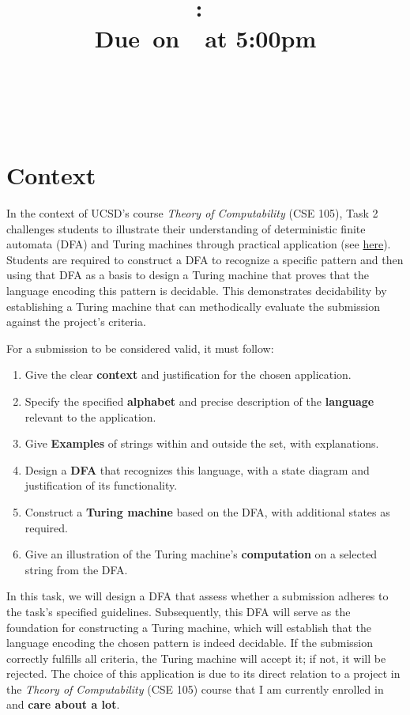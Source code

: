 \documentclass{article}
\title{
    \vspace{2in}
    \textmd{\textbf{\hmwkClass:\ \hmwkTitle}}\\
    \normalsize\vspace{0.1in}\small{Due\ on\ \hmwkDueDate\ at 5:00pm}\\
    \vspace{0.1in}\large{\textit{\hmwkClassInstructor}} \\
    \vspace{3in}
}
\author{
  \hmwkAuthorName \\
  \vspace{0.1in}\small\hmwkPID
}
\date{}
\begin{document}
\maketitle

\pagebreak

\section*{Context}

In the context of UCSD's course \textit{Theory of Computability} (CSE 105), Task 2 challenges
students to illustrate their understanding of deterministic finite automata (DFA) and Turing
machines through practical application (see
\href{https://theory-cs.github.io/output/assignments/projectCSE105W24.html#task-2-illustrating-a-theorem}{here}).
Students are required to construct a DFA to recognize a specific pattern and then using that DFA as
a basis to design a Turing machine that proves that the language encoding this pattern is decidable.
This demonstrates decidability by establishing a Turing machine that can methodically evaluate the
submission against the project's criteria.

For a submission to be considered valid, it must follow:

\begin{enumerate}[Step 1 -]
  \item Give the clear \textbf{context} and justification for the chosen application.
  \item Specify the specified \textbf{alphabet} and precise description of the \textbf{language}
  relevant to the application.
  \item Give \textbf{Examples} of strings within and outside the set, with explanations.
  \item Design a \textbf{DFA} that recognizes this language, with a state diagram and justification
  of its functionality.
  \item Construct a \textbf{Turing machine} based on the DFA, with additional states as required.
  \item Give an illustration of the Turing machine's \textbf{computation} on a selected string from
  the DFA.
\end{enumerate}

In this task, we will design a DFA that assess whether a submission adheres to the task's specified
guidelines. Subsequently, this DFA will serve as the foundation for constructing a Turing machine,
which will establish that the language encoding the chosen pattern is indeed decidable. If the
submission correctly fulfills all criteria, the Turing machine will accept it; if not, it will be
rejected. The choice of this application is due to its direct relation to a project in the
\textit{Theory of Computability} (CSE 105) course that I am currently enrolled in and \textbf{care
about a lot}.
\end{document}
